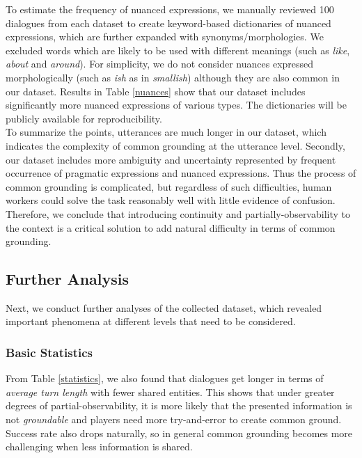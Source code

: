 \documentclass[letterpaper]{article} %
\begin{document}
To estimate the frequency of nuanced expressions, we manually reviewed 100 dialogues from each dataset to create keyword-based dictionaries of nuanced expressions, which are further expanded with synonyms/morphologies. We excluded words which are likely to be used with different meanings (such as \textit{like}, \textit{about} and \textit{around}). For simplicity, we do not consider nuances expressed morphologically (such as \textit{ish} as in \textit{smallish}) although they are also common in our dataset. Results in Table \ref{nuances} show that our dataset includes significantly more nuanced expressions of various types. The dictionaries will be publicly available for reproducibility. \\

To summarize the points, utterances are much longer in our dataset, which indicates the complexity of common grounding at the utterance level. Secondly, our dataset includes more ambiguity and uncertainty represented by frequent occurrence of pragmatic expressions and nuanced expressions. Thus the process of common grounding is complicated, but regardless of such difficulties, human workers could solve the task reasonably well with little evidence of confusion. Therefore, we conclude that introducing continuity and partially-observability to the context is a critical solution to add natural difficulty in terms of common grounding.

\subsection{Further Analysis}

Next, we conduct further analyses of the collected dataset, which revealed important phenomena at different levels that need to be considered.

\subsubsection{Basic Statistics}

From Table \ref{statistics}, we also found that dialogues get longer in terms of \emph{average turn length} with fewer shared entities. This shows that under greater degrees of partial-observability, it is more likely that the presented information is not \emph{groundable} and players need more try-and-error to create common ground. Success rate also drops naturally, so in general common grounding becomes more challenging when less information is shared.
\end{document}
